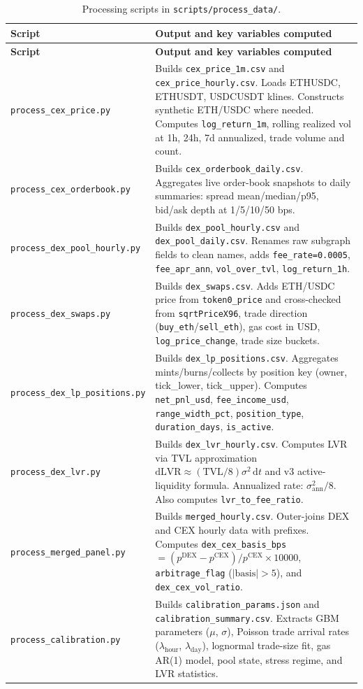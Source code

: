 \documentclass[11pt,a4paper]{article}
\begin{document}
\begin{longtable}{L{5.0cm}L{9.4cm}}
\caption{Processing scripts in \texttt{scripts/process\_data/}.}\\
\toprule
\textbf{Script} & \textbf{Output and key variables computed} \\
\midrule
\endfirsthead
\toprule
\textbf{Script} & \textbf{Output and key variables computed} \\
\midrule
\endhead
\bottomrule
\endfoot
\texttt{process\_cex\_price.py} & Builds \texttt{cex\_price\_1m.csv} and \texttt{cex\_price\_hourly.csv}. Loads ETHUSDC, ETHUSDT, USDCUSDT klines. Constructs synthetic ETH/USDC where needed. Computes \texttt{log\_return\_1m}, rolling realized vol at 1h, 24h, 7d annualized, trade volume and count. \\
\texttt{process\_cex\_orderbook.py} & Builds \texttt{cex\_orderbook\_daily.csv}. Aggregates live order-book snapshots to daily summaries: spread mean/median/p95, bid/ask depth at 1/5/10/50 bps. \\
\texttt{process\_dex\_pool\_hourly.py} & Builds \texttt{dex\_pool\_hourly.csv} and \texttt{dex\_pool\_daily.csv}. Renames raw subgraph fields to clean names, adds \texttt{fee\_rate=0.0005}, \texttt{fee\_apr\_ann}, \texttt{vol\_over\_tvl}, \texttt{log\_return\_1h}. \\
\texttt{process\_dex\_swaps.py} & Builds \texttt{dex\_swaps.csv}. Adds ETH/USDC price from \texttt{token0\_price} and cross-checked from \texttt{sqrtPriceX96}, trade direction (\texttt{buy\_eth}/\texttt{sell\_eth}), gas cost in USD, \texttt{log\_price\_change}, trade size buckets. \\
\texttt{process\_dex\_lp\_positions.py} & Builds \texttt{dex\_lp\_positions.csv}. Aggregates mints/burns/collects by position key (owner, tick\_lower, tick\_upper). Computes \texttt{net\_pnl\_usd}, \texttt{fee\_income\_usd}, \texttt{range\_width\_pct}, \texttt{position\_type}, \texttt{duration\_days}, \texttt{is\_active}. \\
\texttt{process\_dex\_lvr.py} & Builds \texttt{dex\_lvr\_hourly.csv}. Computes LVR via TVL approximation $\mathrm{dLVR} \approx (\mathrm{TVL}/8)\sigma^2 \,\mathrm{d}t$ and v3 active-liquidity formula. Annualized rate: $\sigma^2_{\mathrm{ann}}/8$. Also computes \texttt{lvr\_to\_fee\_ratio}. \\
\texttt{process\_merged\_panel.py} & Builds \texttt{merged\_hourly.csv}. Outer-joins DEX and CEX hourly data with prefixes. Computes \texttt{dex\_cex\_basis\_bps} $=(p^{\mathrm{DEX}}-p^{\mathrm{CEX}})/p^{\mathrm{CEX}} \times 10000$, \texttt{arbitrage\_flag} ($|\text{basis}|>5$), and \texttt{dex\_cex\_vol\_ratio}. \\
\texttt{process\_calibration.py} & Builds \texttt{calibration\_params.json} and \texttt{calibration\_summary.csv}. Extracts GBM parameters ($\mu$, $\sigma$), Poisson trade arrival rates ($\lambda_{\mathrm{hour}}$, $\lambda_{\mathrm{day}}$), lognormal trade-size fit, gas AR(1) model, pool state, stress regime, and LVR statistics. \\
\end{longtable}
\end{document}
